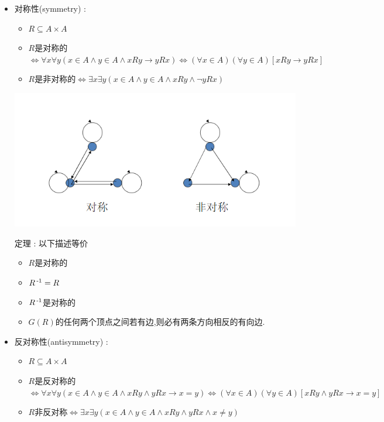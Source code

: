 {{{{\begin{itemize}
{            自反且反自反 : $\emptyset$上的空关系
            }
      \item {
            对称性(symmetry) : \begin{itemize}
              \item $R \subseteq A \times A$
              \item $R$是对称的$\Leftrightarrow \forall x \forall y (x \in A \land y \in A \land xRy \to yRx) \Leftrightarrow (\forall x \in A)(\forall y \in A)[xRy \to yRx]$
              \item $R$是非对称的$\Leftrightarrow \exists x \exists y(x \in A \land y \in A \land xRy \land \lnot yRx)$
            \end{itemize}

            \begin{center}
              \includegraphics{resources/symmetry.png}
            \end{center}

            定理 : 以下描述等价
            \begin{itemize}
              \item $R$是对称的
              \item $R\operatorname{^{-1}} = R$
              \item $R\operatorname{^{-1}}$是对称的
              \item $G(R)$的任何两个顶点之间若有边,则必有两条方向相反的有向边.
            \end{itemize}
            }
      \item {
            反对称性(antisymmetry) : \begin{itemize}
              \item $R \subseteq A \times A$
              \item $R$是反对称的$\Leftrightarrow \forall x \forall y(x \in A \land y \in A \land xRy \land yRx \to x = y) \Leftrightarrow (\forall x \in A)(\forall y \in A)[xRy \land yRx \to x = y]$
              \item $R$非反对称$\Leftrightarrow \exists x \exists y (x \in A \land y \in A \land xRy \land yRx \land x \neq y)$
            \end{itemize}

}
\end{itemize}}}}}
